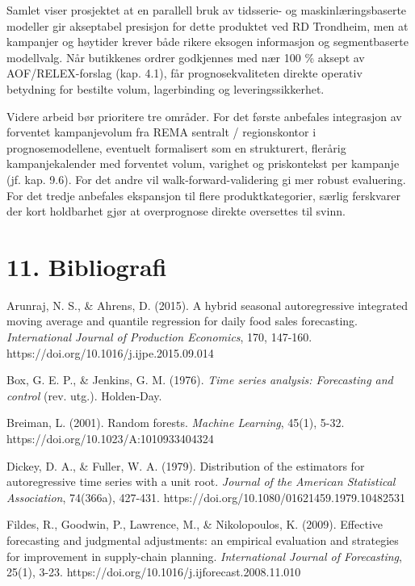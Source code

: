 \documentclass[
  norsk,
  11pt,
  a4paper,
]{article}
\begin{document}
Samlet viser prosjektet at en parallell bruk av tidsserie- og
maskinlæringsbaserte modeller gir akseptabel presisjon for dette
produktet ved RD Trondheim, men at kampanjer og høytider krever både
rikere eksogen informasjon og segmentbaserte modellvalg. Når butikkenes
ordrer godkjennes med nær 100 \% aksept av AOF/RELEX-forslag (kap. 4.1),
får prognosekvaliteten direkte operativ betydning for bestilte volum,
lagerbinding og leveringssikkerhet.

Videre arbeid bør prioritere tre områder. For det første anbefales
integrasjon av forventet kampanjevolum fra REMA sentralt / regionskontor
i prognosemodellene, eventuelt formalisert som en strukturert, flerårig
kampanjekalender med forventet volum, varighet og priskontekst per
kampanje (jf. kap. 9.6). For det andre vil walk-forward-validering gi
mer robust evaluering. For det tredje anbefales ekspansjon til flere
produktkategorier, særlig ferskvarer der kort holdbarhet gjør at
overprognose direkte oversettes til svinn.

\newpage

\section{11. Bibliografi}\label{bibliografi}

Arunraj, N. S., \& Ahrens, D. (2015). A hybrid seasonal autoregressive
integrated moving average and quantile regression for daily food sales
forecasting. \emph{International Journal of Production Economics}, 170,
147-160. https://doi.org/10.1016/j.ijpe.2015.09.014

Box, G. E. P., \& Jenkins, G. M. (1976). \emph{Time series analysis:
Forecasting and control} (rev. utg.). Holden-Day.

Breiman, L. (2001). Random forests. \emph{Machine Learning}, 45(1),
5-32. https://doi.org/10.1023/A:1010933404324

Dickey, D. A., \& Fuller, W. A. (1979). Distribution of the estimators
for autoregressive time series with a unit root. \emph{Journal of the
American Statistical Association}, 74(366a), 427-431.
https://doi.org/10.1080/01621459.1979.10482531

Fildes, R., Goodwin, P., Lawrence, M., \& Nikolopoulos, K. (2009).
Effective forecasting and judgmental adjustments: an empirical
evaluation and strategies for improvement in supply-chain planning.
\emph{International Journal of Forecasting}, 25(1), 3-23.
https://doi.org/10.1016/j.ijforecast.2008.11.010
\end{document}
